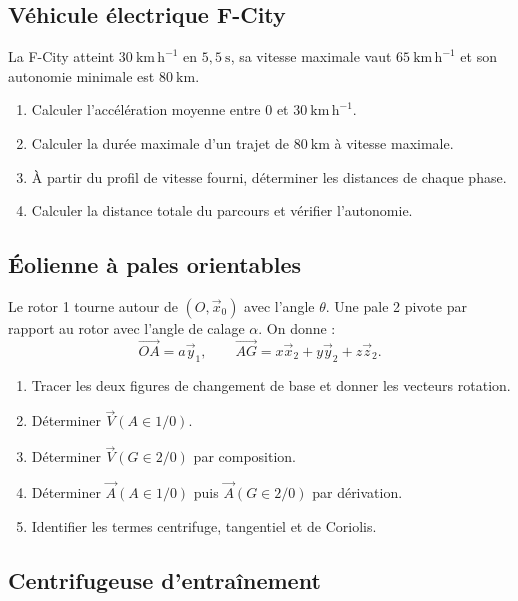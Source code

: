 \subsection{Véhicule électrique F-City}

La F-City atteint $30\ \mathrm{km\,h^{-1}}$ en $5{,}5\ \mathrm s$, sa
vitesse maximale vaut $65\ \mathrm{km\,h^{-1}}$ et son autonomie
minimale est $80\ \mathrm{km}$.


\begin{enumerate}
  \item Calculer l'accélération moyenne entre 0 et $30\ \mathrm{km\,h^{-1}}$.
  \item Calculer la durée maximale d'un trajet de $80\ \mathrm{km}$ à vitesse maximale.
  \item À partir du profil de vitesse fourni, déterminer les distances de chaque phase.
  \item Calculer la distance totale du parcours et vérifier l'autonomie.
\end{enumerate}

\subsection{Éolienne à pales orientables}

Le rotor 1 tourne autour de $(O,\vec x_0)$ avec l'angle $\theta$. Une
pale 2 pivote par rapport au rotor avec l'angle de calage $\alpha$.
On donne :
\[
\overrightarrow{OA}=a\vec y_1,
\qquad
\overrightarrow{AG}=x\vec x_2+y\vec y_2+z\vec z_2.
\]


\begin{enumerate}
  \item Tracer les deux figures de changement de base et donner les vecteurs rotation.
  \item Déterminer $\vec V(A\in1/0)$.
  \item Déterminer $\vec V(G\in2/0)$ par composition.
  \item Déterminer $\vec A(A\in1/0)$ puis $\vec A(G\in2/0)$ par dérivation.
  \item Identifier les termes centrifuge, tangentiel et de Coriolis.
\end{enumerate}

\subsection{Centrifugeuse d'entraînement}

